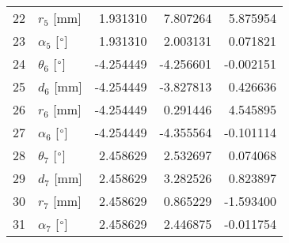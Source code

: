 \documentclass{standalone}%
\begin{document}
\begin{tabular}{llrrr}
22 &              $r_{5}$ [mm] &  1.931310 &   7.807264 &   5.875954 \\
23 &  $\alpha_{5}$ [$\degree$] &  1.931310 &   2.003131 &   0.071821 \\
24 &  $\theta_{6}$ [$\degree$] & -4.254449 &  -4.256601 &  -0.002151 \\
25 &              $d_{6}$ [mm] & -4.254449 &  -3.827813 &   0.426636 \\
26 &              $r_{6}$ [mm] & -4.254449 &   0.291446 &   4.545895 \\
27 &  $\alpha_{6}$ [$\degree$] & -4.254449 &  -4.355564 &  -0.101114 \\
28 &  $\theta_{7}$ [$\degree$] &  2.458629 &   2.532697 &   0.074068 \\
29 &              $d_{7}$ [mm] &  2.458629 &   3.282526 &   0.823897 \\
30 &              $r_{7}$ [mm] &  2.458629 &   0.865229 &  -1.593400 \\
31 &  $\alpha_{7}$ [$\degree$] &  2.458629 &   2.446875 &  -0.011754 \\
\bottomrule
\end{tabular}
%
\end{document}
